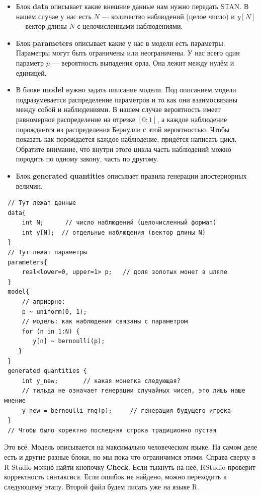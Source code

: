 \documentclass[12pt, a4paper, oneside]{extreport}
\theoremstyle{plain}              %
\theoremstyle{definition}         %
\begin{document}
 \begin{itemize}
 	\item  Блок \textbf{data} описывает какие внешние данные нам нужно передать STAN.  В нашем случае у нас есть  $N$ --- количество наблюдений (целое число) и $y[N]$ --- вектор длины $N$ с целочисленными наблюдениями. 
 	
 	\item Блок \textbf{parameters} описывает какие у нас в модели есть параметры. Параметры могут быть ограничены или неограничены.  У нас всего один параметр  $p$ ---  вероятность выпадения орла. Она лежит между нулём и единицей. 
 	
 	\item В блоке \textbf{model} нужно задать описание модели. Под описанием модели подразумевается распределение параметров и то как они взаимосвязаны между собой и наблюдениями.  В нашем случае вероятность имеет равномерное распределение на отрезке $[0;1]$, а каждое наблюдение порождается из распределения Бернулли с этой вероятностью.  Чтобы показать как порождается каждое наблюдение, придётся написать цикл. Обратите внимание, что внутри этого цикла часть наблюдений можно породить по одному закону, часть по другому.
 	
 	\item Блок \textbf{generated quantities} описывает правила генерации апостериорных величин. 
 \end{itemize}
 
 \begin{center}
  \begin{verbatim}
 // Тут лежат данные
 data{
     int N;      // число наблюдений (целочисленный формат)
     int y[N];  // отдельные наблюдения (вектор длины N)
 }
 // Тут лежат параметры
 parameters{
     real<lower=0, upper=1> p;   // доля золотых монет в шляпе
 }
 model{
     // априорно:
     p ~ uniform(0, 1);
     // модель: как наблюдения связаны с параметром
     for (n in 1:N) {
        y[n] ~ bernoulli(p);
    }
 }
 generated quantities {
     int y_new;       // какая монетка следующая?
     // тильда не означает генерации случайных чисел, это лишь наше мнение
     y_new = bernoulli_rng(p);     // генерация будущего игрека
 }
 // Чтобы было коректно последняя строка традиционно пустая
 \end{verbatim}
 \end{center} 
 

 Это всё. Модель описывается на максимально человеческом языке.  На самом деле есть и другие разные блоки, но мы пока что ограничимся этими.  Справа сверху в R-Studio можно найти кнопочку \textbf{Check}. Если тыкнуть на неё, RStudio проверит корректность синтаксиса. Если ошибок не найдено, можно переходить к следующему этапу.  Второй файл будем писать уже на языке R. 
 
\end{document}
